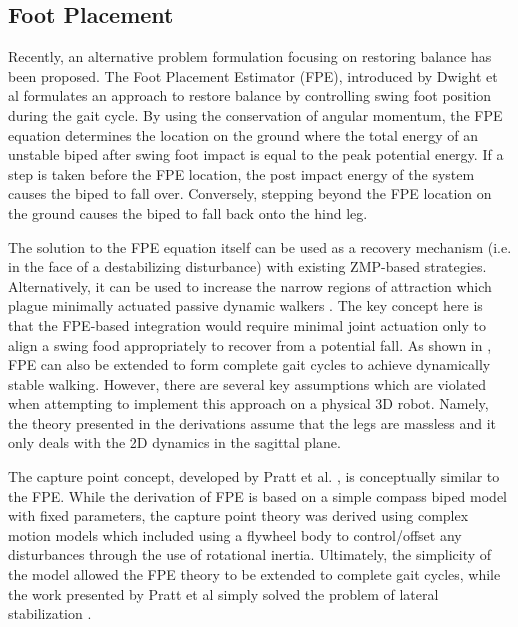 \subsection{Foot Placement} %
\label{sub:related_foot_placement}
Recently, an alternative problem formulation focusing on restoring balance has been proposed. The Foot Placement Estimator (FPE), introduced by Dwight et al \cite{Wight:2008ii} formulates an approach to restore balance by controlling swing foot position during the gait cycle. By using the conservation of angular momentum, the FPE equation determines the location on the ground where the total energy of an unstable biped after swing foot impact is equal to the peak potential energy. If a step is taken before the FPE location, the post impact energy of the system causes the biped to fall over. Conversely, stepping beyond the FPE location on the ground causes the biped to fall back onto the hind leg.

The solution to the FPE equation itself can be used as a recovery mechanism (i.e. in the face of a destabilizing disturbance) with existing ZMP-based strategies. Alternatively, it can be used to increase the narrow regions of attraction which plague minimally actuated passive dynamic walkers \cite{Goswami:1996gn,Asano:2000wi,Kuo:1999tn}. The key concept here is that the FPE-based integration would require minimal joint actuation only to align a swing food appropriately to recover from a potential fall. As shown in \cite{Wight:2008ii,Wight:2008vt}, FPE can also be extended to form complete gait cycles to achieve dynamically stable walking. However, there are several key assumptions which are violated when attempting to implement this approach on a physical 3D robot. Namely, the theory presented in the derivations assume that the legs are massless and it only deals with the 2D dynamics in the sagittal plane.

The capture point concept, developed by Pratt et al. \cite{Pratt:2006vy}, is conceptually similar to the FPE. While the derivation of FPE is based on a simple compass biped model with fixed parameters, the capture point theory was derived using complex motion models which included using a flywheel body to control/offset any disturbances through the use of rotational inertia. Ultimately, the simplicity of the model allowed the FPE theory to be extended to complete gait cycles, while the work presented by Pratt et al simply solved the problem of lateral stabilization \cite{Wight:2008ii}.

